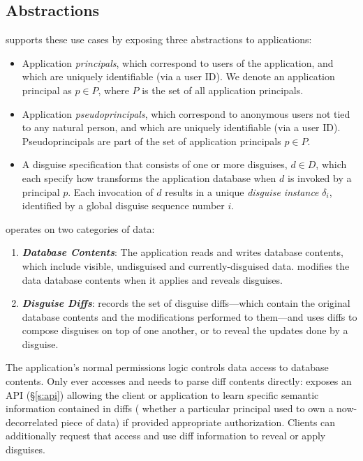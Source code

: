 \subsection{\sys Abstractions}
\sys supports these use cases by exposing three abstractions to applications:
\begin{itemize}
    \item Application \emph{principals}, which correspond to users of the application, 
	and which are uniquely identifiable (\eg via a user ID).
	We denote an application principal as $p \in P$, where $P$ is the set of all application principals.
    \item Application \emph{pseudoprincipals}, which correspond to anonymous users not tied to any natural
    person, and which are uniquely identifiable (\eg via a user ID).
	Pseudoprincipals are part of the set of application principals $p \in P$.
    \item A disguise specification that consists of one or more disguises, $d \in D$, which each specify
	how \sys transforms the application database when $d$ is invoked by a principal $p$.
	Each invocation of $d$ results in a unique \emph{disguise instance} $\delta_i$, identified by
        a global disguise sequence number $i$.
\end{itemize}
%
%
\sys operates on two categories of data:
\begin{enumerate}
    \item \emph{\textbf{Database Contents}}: The application reads and writes database
        contents, which include visible, undisguised and currently-disguised data.
        \sys modifies the data database contents when it applies and reveals disguises.
    \item \emph{\textbf{Disguise Diffs}}: \sys records the set of disguise diffs---which contain the
        original database contents and the modifications performed to them---and uses diffs to
        compose disguises on top of one another, or to reveal the updates done by a disguise. 
\end{enumerate}

The application's normal permissions logic controls data access to database contents.  Only \sys
ever accesses and needs to parse diff contents directly: \sys exposes an API (\S\ref{s:api})
allowing the client or application to learn specific semantic information contained in diffs (\eg
whether a particular principal used to own a now-decorrelated piece of data) if
provided appropriate authorization. Clients can
additionally request that \sys access and use diff information to reveal or apply disguises.

